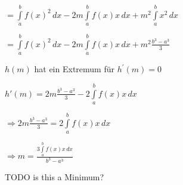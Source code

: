 $ = \int\limits_{a}^{b}f(x)^{2}\,dx 
-2m\int\limits_{a}^{b}f(x)x\,dx 
+ m^{2}\int\limits_{a}^{b}x^{2}\,dx$

$ = \int\limits_{a}^{b}f(x)^{2}\,dx 
-2m\int\limits_{a}^{b}f(x)x\,dx 
+ m^{2}\frac{b^{3}-a^{3}}{3}$

$h(m)$ hat ein Extremum für $h^{\prime}(m) = 0$

$ h'(m) = 2m\frac{b^{3}-a^{3}}{3} - 2\int\limits_{a}^{b}f(x)x\,dx $

$\Rightarrow 2m\frac{b^{3}-a^{3}}{3} =  2\int\limits_{a}^{b}f(x)x\,dx $

$\Rightarrow m =  \frac{3\int\limits_{a}^{b}f(x)x\,dx}{b^{3}-a^{3}} $

TODO is this a Minimum?

